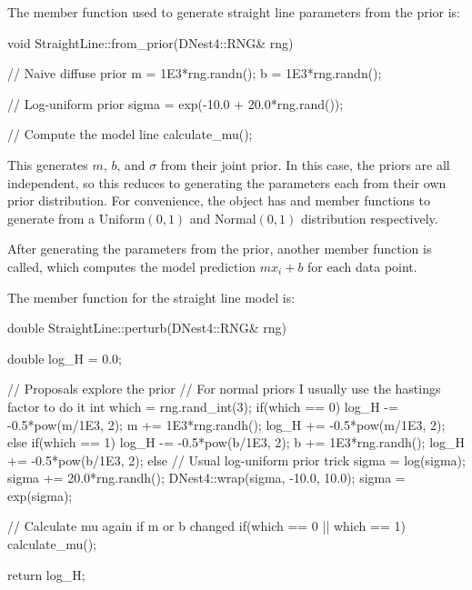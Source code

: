 \documentclass[article]{jss}
\begin{document}



The member function used to generate straight line parameters from the
prior is:

\begin{CodeChunk}
\begin{CodeInput}
void StraightLine::from_prior(DNest4::RNG\& rng)
{
   // Naive diffuse prior
   m = 1E3*rng.randn();
   b = 1E3*rng.randn();

   // Log-uniform prior
   sigma = exp(-10.0 + 20.0*rng.rand());

   // Compute the model line
   calculate_mu();
}
\end{CodeInput}
\end{CodeChunk}

This generates $m$, $b$, and $\sigma$ from their joint prior. In this case,
the priors are all independent, so this reduces to generating the parameters
each from their own prior distribution. For convenience, the  object
has  and  member functions to generate from
a Uniform$(0,1)$ and Normal$(0,1)$ distribution respectively.

After generating the parameters from the prior, another member function
 is called, which computes the model prediction
$mx_i + b$ for each data point.

The  member function for the straight line model is:
\begin{CodeChunk}
\begin{CodeInput}
double StraightLine::perturb(DNest4::RNG& rng)
{
	double log_H = 0.0;

	// Proposals explore the prior
	// For normal priors I usually use the hastings factor to do it
	int which = rng.rand_int(3);
	if(which == 0)
	{
		log_H -= -0.5*pow(m/1E3, 2);
		m += 1E3*rng.randh();
		log_H += -0.5*pow(m/1E3, 2);
	}
	else if(which == 1)
	{
		log_H -= -0.5*pow(b/1E3, 2);
		b += 1E3*rng.randh();
		log_H += -0.5*pow(b/1E3, 2);
	}
	else
	{
		// Usual log-uniform prior trick
		sigma = log(sigma);
		sigma += 20.0*rng.randh();
		DNest4::wrap(sigma, -10.0, 10.0);
		sigma = exp(sigma);
	}

	// Calculate mu again if m or b changed
	if(which == 0 || which == 1)
		calculate_mu();

	return log_H;
}
\end{CodeInput}
\end{CodeChunk}
\end{document}
